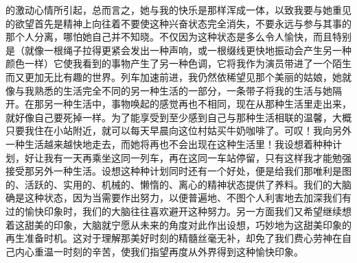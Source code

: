 的激动心情所引起，总而言之，她与我的快乐是那样浑成一体，以致我要与她重见的欲望首先是精神上向往着不要使这种兴奋状态完全消失，不要永远与参与其事的那个人分离，哪怕她自己并不知晓。不仅因为这种状态是多么令人愉快，而且特别是（就像一根绳子拉得更紧会发出一种声响，或一根缀线更快地振动会产生另一种颜色一样）它使我看到的事物产生了另一种色调，它将我作为演员带进了一个陌生而又更加无比有趣的世界。列车加速前进，我仍然依稀望见那个美丽的姑娘，她就像与我熟悉的生活完全不同的另一种生活的一部分，一条带子将我的生活与她隔开。在那另一种生活中，事物唤起的感觉再也不相同，现在从那种生活里走出来，就好像自己要死掉一样。为了能享受到至少感到自己与那种生活相联的温馨，大概只要我住在小站附近，就可以每天早晨向这位村姑买牛奶咖啡了。可叹！我向另外一种生活越来越快地走去，而她将再也不会出现在这种生活里！我设想着种种计划，好让我有一天再乘坐这同一列车，再在这同一车站停留，只有这样我才能勉强接受那另外一种生活。设想这种种计划同时还有一个好处，便是给我们那唯利是图的、活跃的、实用的、机械的、懒惰的、离心的精神状态提供了养料。我们的大脑确是这种状态，因为当需要作出努力，以便普遍地、不图个人利害地去加深我们有过的愉快印象时，我们的大脑往往喜欢避开这种努力。另一方面我们又希望继续想着这甜美的印象，大脑就宁愿从未来的角度对此作出设想，巧妙地为这甜美印象的再生准备时机。这对于理解那美好时刻的精髓丝毫无补，却免了我们费心劳神在自己内心重温一时刻的辛苦，使我们指望再度从外界得到这种愉快印象。
